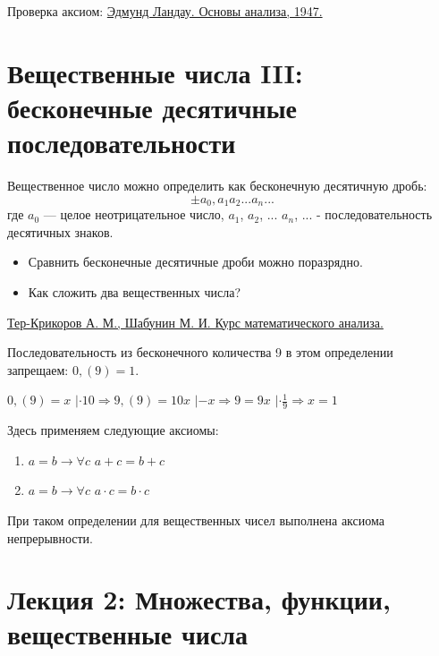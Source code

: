 	Проверка аксиом: \href{http://ikfia.ysn.ru/wp-content/uploads/2018/01/Landau1947ru.pdf}{Эдмунд Ландау. Основы анализа, 1947.}
	
	\section{Вещественные числа III: бесконечные десятичные последовательности}
	
	\begin{definition}
		Вещественное число можно определить как бесконечную
		десятичную дробь:
		\[ \pm a_0, a_1 a_2 ... a_n ... \]		
		где $a_0$ — целое неотрицательное число, $a_1$, $a_2$, ... $a_n$, ... - последовательность десятичных знаков.
	\end{definition}
	
	\begin{itemize}
		\item Сравнить бесконечные десятичные дроби можно поразрядно.
		\item Как сложить два вещественных числа?
	\end{itemize}
	
	\href{https://timofey.pro/static/pdfdocs/AI_004_Ter_Krikorov_2001_672s.pdf}{Тер-Крикоров А. М., Шабунин М. И. Курс математического анализа.}
	
    Последовательность из бесконечного количества 9 в этом определении запрещаем: $0,(9) = 1$.
    
    $0,(9) = x$ $| \cdot  10 \Rightarrow 9,(9) = 10x$ $| -x \Rightarrow 9 = 9x$ $| \cdot \frac{1}{9} \Rightarrow x = 1$
    
    Здесь применяем следующие аксиомы:
    
    \begin{enumerate}
    	\item $a = b \rightarrow \forall c$ $a + c = b + c$
    	\item $a = b \rightarrow \forall c$ $a \cdot c = b \cdot c$
    \end{enumerate}
	
	\begin{theorem}
		При таком определении для вещественных чисел выполнена
		аксиома непрерывности.
	\end{theorem}
	
	\newpage

	\section*{Лекция 2: Множества, функции, вещественные числа}
	
